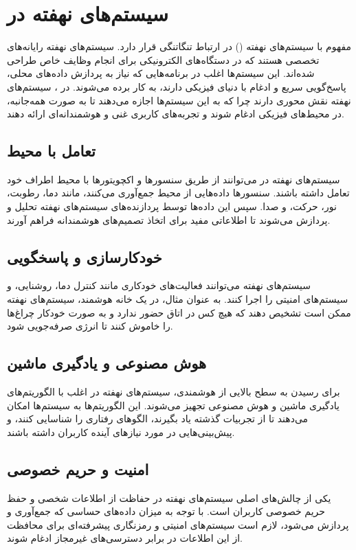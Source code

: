 \section*{سیستم‌های نهفته در }

مفهوم
\textbf{}
با سیستم‌های نهفته
(\textbf{})
در ارتباط تنگاتنگی قرار دارد. سیستم‌های نهفته رایانه‌های تخصصی هستند که در دستگاه‌های الکترونیکی برای انجام وظایف خاص طراحی شده‌اند. این سیستم‌ها اغلب در برنامه‌هایی که نیاز به پردازش داده‌های محلی، پاسخ‌گویی سریع و ادغام با دنیای فیزیکی دارند، به کار برده می‌شوند. در  ، سیستم‌های نهفته نقش محوری دارند چرا که به این سیستم‌ها اجازه می‌دهند تا به صورت همه‌جانبه، در محیط‌های فیزیکی ادغام شوند و تجربه‌های کاربری غنی و هوشمندانه‌ای ارائه دهند.

\subsection*{تعامل با محیط}
سیستم‌های نهفته در  می‌توانند از طریق سنسورها و اکچویتورها با محیط اطراف خود تعامل داشته باشند. سنسورها داده‌هایی از محیط جمع‌آوری می‌کنند، مانند دما، رطوبت، نور، حرکت، و صدا. سپس این داده‌ها توسط پردازنده‌های سیستم‌های نهفته تحلیل و پردازش می‌شوند تا اطلاعاتی مفید برای اتخاذ تصمیم‌های هوشمندانه فراهم آورند.

\subsection*{خودکارسازی و پاسخگویی}
سیستم‌های نهفته می‌توانند فعالیت‌های خودکاری مانند کنترل دما، روشنایی، و سیستم‌های امنیتی را اجرا کنند. به عنوان مثال، در یک خانه هوشمند، سیستم‌های نهفته ممکن است تشخیص دهند که هیچ کس در اتاق حضور ندارد و به صورت خودکار چراغ‌ها را خاموش کنند تا انرژی صرفه‌جویی شود.

\subsection*{هوش مصنوعی و یادگیری ماشین}
برای رسیدن به سطح بالایی از هوشمندی، سیستم‌های نهفته در  اغلب با الگوریتم‌های یادگیری ماشین و هوش مصنوعی تجهیز می‌شوند. این الگوریتم‌ها به سیستم‌ها امکان می‌دهند تا از تجربیات گذشته یاد بگیرند، الگوهای رفتاری را شناسایی کنند، و پیش‌بینی‌هایی در مورد نیازهای آینده کاربران داشته باشند.

\subsection*{امنیت و حریم خصوصی}
یکی از چالش‌های اصلی سیستم‌های نهفته در  حفاظت از اطلاعات شخصی و حفظ حریم خصوصی کاربران است. با توجه به میزان داده‌های حساسی که جمع‌آوری و پردازش می‌شود، لازم است سیستم‌های امنیتی و رمزنگاری پیشرفته‌ای برای محافظت از این اطلاعات در برابر دسترسی‌های غیرمجاز ادغام شوند.

